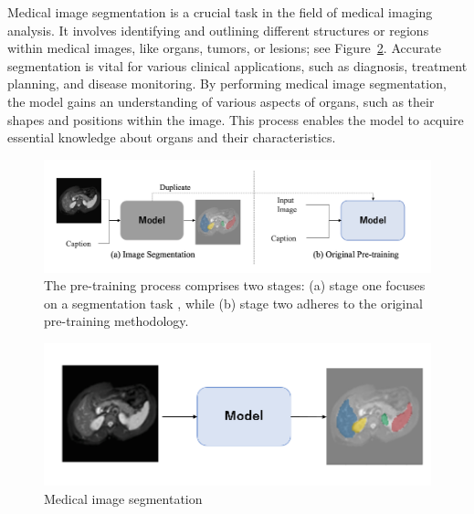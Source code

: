 Medical image segmentation is a crucial task in the field of medical imaging analysis. It involves identifying and outlining different structures or regions within medical images, like organs, tumors, or lesions; see Figure~\ref{fig:segment}. Accurate segmentation is vital for various clinical applications, such as diagnosis, treatment planning, and disease monitoring. By performing medical image segmentation, the model gains an understanding of various aspects of organs, such as their shapes and positions within the image. This process enables the model to acquire essential knowledge about organs and their characteristics.

\begin{figure}[t]
\begin{center}
\includegraphics[width=1.0\linewidth]{Chapter_3/chap3_proposedPretrainStep.png}
\end{center}
   \caption{The pre-training process comprises two stages: (a) stage one focuses on a segmentation task \cite{kavur2021chaos}, while (b) stage two adheres to the original pre-training methodology. 
}
\label{fig:proposedPretrainStep}
\end{figure}

\begin{figure}[t]
\begin{center}
\includegraphics[width=1.0\linewidth]{Chapter_3/chap3_segmen.png}
\end{center}
   \caption{Medical image segmentation \cite{kavur2021chaos} 
}
\label{fig:segment}
\end{figure}

